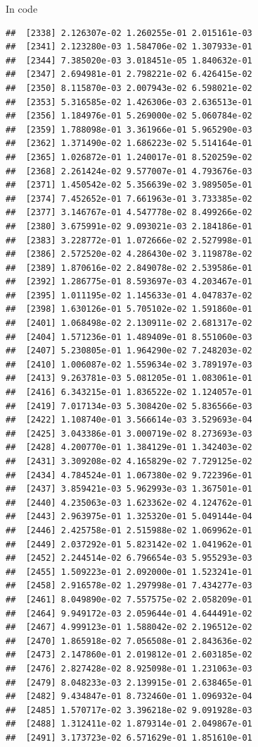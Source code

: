 \documentclass[ignorenonframetext,]{beamer}
\begin{document}
\begin{frame}[fragile]{In code}
\begin{verbatim}
##  [2338] 2.126307e-02 1.260255e-01 2.015161e-03
##  [2341] 2.123280e-03 1.584706e-02 1.307933e-01
##  [2344] 7.385020e-03 3.018451e-05 1.840632e-01
##  [2347] 2.694981e-01 2.798221e-02 6.426415e-02
##  [2350] 8.115870e-03 2.007943e-02 6.598021e-02
##  [2353] 5.316585e-02 1.426306e-03 2.636513e-01
##  [2356] 1.184976e-01 5.269000e-02 5.060784e-02
##  [2359] 1.788098e-01 3.361966e-01 5.965290e-03
##  [2362] 1.371490e-02 1.686223e-02 5.514164e-01
##  [2365] 1.026872e-01 1.240017e-01 8.520259e-02
##  [2368] 2.261424e-02 9.577007e-01 4.793676e-03
##  [2371] 1.450542e-02 5.356639e-02 3.989505e-01
##  [2374] 7.452652e-01 7.661963e-01 3.733385e-02
##  [2377] 3.146767e-01 4.547778e-02 8.499266e-02
##  [2380] 3.675991e-02 9.093021e-03 2.184186e-01
##  [2383] 3.228772e-01 1.072666e-02 2.527998e-01
##  [2386] 2.572520e-02 4.286430e-02 3.119878e-02
##  [2389] 1.870616e-02 2.849078e-02 2.539586e-01
##  [2392] 1.286775e-01 8.593697e-03 4.203467e-01
##  [2395] 1.011195e-02 1.145633e-01 4.047837e-02
##  [2398] 1.630126e-01 5.705102e-02 1.591860e-01
##  [2401] 1.068498e-02 2.130911e-02 2.681317e-02
##  [2404] 1.571236e-01 1.489409e-01 8.551060e-03
##  [2407] 5.230805e-01 1.964290e-02 7.248203e-02
##  [2410] 1.006087e-02 1.559634e-02 3.789197e-03
##  [2413] 9.263781e-03 5.081205e-01 1.083061e-01
##  [2416] 6.343215e-01 1.836522e-02 1.124057e-01
##  [2419] 7.017134e-03 5.308420e-02 5.836566e-03
##  [2422] 1.108740e-01 3.566614e-03 3.529693e-04
##  [2425] 3.043386e-01 3.000719e-02 8.273693e-03
##  [2428] 4.200770e-01 1.384129e-01 1.342403e-02
##  [2431] 3.309208e-02 4.165829e-02 7.729125e-02
##  [2434] 4.784524e-01 1.067380e-02 9.722396e-01
##  [2437] 3.859421e-03 5.962993e-03 1.367501e-01
##  [2440] 4.235063e-03 1.623362e-02 4.124762e-01
##  [2443] 2.963975e-01 1.325320e-01 5.049144e-04
##  [2446] 2.425758e-01 2.515988e-02 1.069962e-01
##  [2449] 2.037292e-01 5.823142e-02 1.041962e-01
##  [2452] 2.244514e-02 6.796654e-03 5.955293e-03
##  [2455] 1.509223e-01 2.092000e-01 1.523241e-01
##  [2458] 2.916578e-02 1.297998e-01 7.434277e-03
##  [2461] 8.049890e-02 7.557575e-02 2.058209e-01
##  [2464] 9.949172e-03 2.059644e-01 4.644491e-02
##  [2467] 4.999123e-01 1.588042e-02 2.196512e-02
##  [2470] 1.865918e-02 7.056508e-01 2.843636e-02
##  [2473] 2.147860e-01 2.019812e-01 2.603185e-02
##  [2476] 2.827428e-02 8.925098e-01 1.231063e-03
##  [2479] 8.048233e-03 2.139915e-01 2.638465e-01
##  [2482] 9.434847e-01 8.732460e-01 1.096932e-04
##  [2485] 1.570717e-02 3.396218e-02 9.091928e-03
##  [2488] 1.312411e-02 1.879314e-01 2.049867e-01
##  [2491] 3.173723e-02 6.571629e-01 1.851610e-01

\end{verbatim}
\end{frame}
\end{document}
